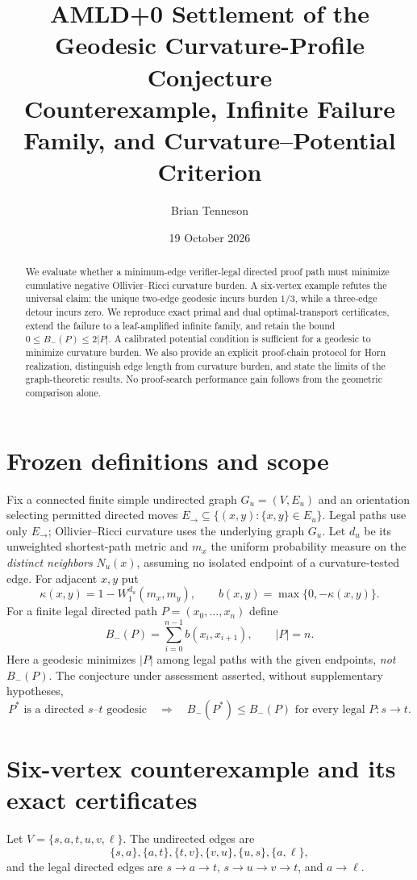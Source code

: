 
\usepackage{tikz}
\title{\textbf{AMLD+0 Settlement of the Geodesic Curvature-Profile Conjecture}\\[0.3em]\large Counterexample, Infinite Failure Family, and Curvature--Potential Criterion}
\author{Brian Tenneson}
\date{19 October 2026}
\maketitle
\begin{abstract}
We evaluate whether a minimum-edge verifier-legal directed proof path must minimize cumulative negative Ollivier--Ricci curvature burden. A six-vertex example refutes the universal claim: the unique two-edge geodesic incurs burden $1/3$, while a three-edge detour incurs zero. We reproduce exact primal and dual optimal-transport certificates, extend the failure to a leaf-amplified infinite family, and retain the bound $0\le B_-(P)\le2|P|$. A calibrated potential condition is sufficient for a geodesic to minimize curvature burden. We also provide an explicit proof-chain protocol for Horn realization, distinguish edge length from curvature burden, and state the limits of the graph-theoretic results. No proof-search performance gain follows from the geometric comparison alone.
\end{abstract}
\section{Frozen definitions and scope}
Fix a connected finite simple undirected graph $G_u=(V,E_u)$ and an orientation selecting permitted directed moves $E_{\to}\subseteq\{(x,y):\{x,y\}\in E_u\}$. Legal paths use only $E_{\to}$; Ollivier--Ricci curvature uses the underlying graph $G_u$. Let $d_u$ be its unweighted shortest-path metric and $m_x$ the uniform probability measure on the \emph{distinct neighbors} $N_u(x)$, assuming no isolated endpoint of a curvature-tested edge. For adjacent $x,y$ put
\[\kappa(x,y)=1-W_1^{d_u}(m_x,m_y),\qquad b(x,y)=\max\{0,-\kappa(x,y)\}.\]
For a finite legal directed path $P=(x_0,\dots,x_n)$ define
\[B_-(P)=\sum_{i=0}^{n-1}b(x_i,x_{i+1}),\qquad |P|=n.\]
Here a geodesic minimizes $|P|$ among legal paths with the given endpoints, \emph{not} $B_-(P)$. The conjecture under assessment asserted, without supplementary hypotheses,
\[P^*\text{ is a directed }s\text{--}t\text{ geodesic}\quad\Longrightarrow\quad B_-(P^*)\le B_-(P)\text{ for every legal }P:s\to t.\]
\section{Six-vertex counterexample and its exact certificates}
Let $V=\{s,a,t,u,v,\ell\}$. The undirected edges are
\[\{s,a\},\{a,t\},\{t,v\},\{v,u\},\{u,s\},\{a,\ell\},\]
and the legal directed edges are $s\to a\to t$, $s\to u\to v\to t$, and $a\to\ell$.

